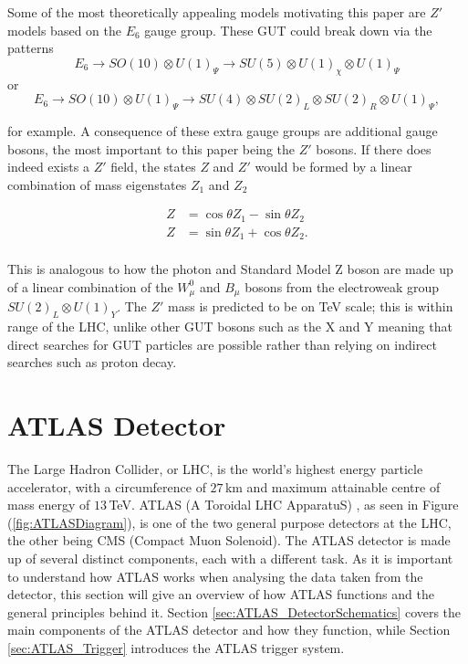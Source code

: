 \documentclass{article}
\begin{document}
Some of the most theoretically appealing models motivating this paper are $Z'$ models based on the  $E_6$ gauge group. These GUT could break down via the patterns \cite{ExtraGaugeBosonsE6}
\begin{equation}
E_{6} \rightarrow SO(10) \otimes U(1)_\Psi \rightarrow SU(5)\otimes U(1)_\chi \otimes U(1)_\Psi
\end{equation}
or 
\begin{equation}
E_{6} \rightarrow SO(10) \otimes U(1)_\Psi \rightarrow SU(4) \otimes SU(2)_L \otimes SU(2)_R \otimes U(1)_\Psi,
\end{equation}

for example. A consequence of these extra gauge groups are additional gauge bosons, the most important to this paper being the $Z'$ bosons. If there does indeed exists a $Z'$ field, the states $Z$ and $Z'$ would be formed by a linear combination of mass eigenstates $Z_1$ and $Z_2$ \cite{ColliderPhysics}

\begin{equation}
\begin{split}
Z & = \cos\theta Z_1 - \sin\theta Z_2 \\
Z & = \sin\theta Z_1 + \cos\theta Z_2. \\
\end{split}
\end{equation}

This is analogous to how the photon and Standard Model Z boson are made up of a linear combination of the $W^{0}_\mu$ and $B_\mu$ bosons from the electroweak group $SU(2)_L \otimes U(1)_Y$. The $Z'$ mass is predicted to be on TeV scale; this is within range of the LHC, unlike other GUT bosons such as the X and Y meaning that direct searches for GUT particles are possible rather than relying on indirect searches such as proton decay.

\section{ATLAS Detector}%
\label{sec:ATLAS}

The Large Hadron Collider, or LHC, is the world's highest energy particle accelerator, with a circumference of $27\,$km and maximum attainable centre of mass energy of $13\,$TeV. 
ATLAS (A Toroidal LHC ApparatuS) \cite{ATLAS}, as seen in Figure (\ref{fig:ATLASDiagram}), is one of the two general purpose detectors at the LHC, the other being CMS (Compact Muon Solenoid). The ATLAS detector is made up of several distinct components, each with a different task. As it is important to understand how ATLAS works when analysing the data taken from the detector, this section will give an overview of how ATLAS functions and the general principles behind it. Section \ref{sec:ATLAS_DetectorSchematics} covers the main components of the ATLAS detector and how they function, while Section \ref{sec:ATLAS_Trigger} introduces the ATLAS trigger system.
\end{document}
